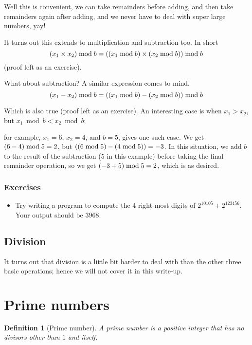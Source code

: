 \documentclass{article}
\newtheorem{definition}{Definition}
\DeclarePairedDelimiter{\braces}{(}{)}
\begin{document}
Well this is convenient, we can take remainders before adding, and then take
remainders again after adding, and we never have to deal with super large numbers, yay!

\vspace{1em}

It turns out this extends to multiplication and subtraction too.
In short
\[\left(x_1 \times x_2\right) \bmod b =
\braces*{\braces*{x_1 \bmod b} \times \braces*{x_2 \bmod b}} \bmod b\]
(proof left as an exercise).

What about subtraction?
A similar expression comes to mind.
\[\left(x_1 - x_2\right) \bmod b =
\braces*{\braces*{x_1 \bmod b} - \braces*{x_2 \bmod b}} \bmod b\]

Which is also true (proof left as an exercise).
An interesting case is when $x_1 > x_2$, but $x_1 \bmod b < x_2 \bmod b$;

for example, $x_1 = 6$, $x_2 = 4$, and $b = 5$, gives one such case.
We get $\braces*{6 - 4} \bmod 5 = 2$, but
$\braces*{\braces*{6 \bmod 5} - \braces*{4 \bmod 5}} = -3$.
In this situation, we add $b$ to the result of the subtraction
($5$ in this example) before taking the final remainder operation, 
so we get $\braces*{-3 + 5} \bmod 5 = 2$, which is as desired.

\subsubsection{Exercises}
\begin{itemize}
	\item
		Try writing a program to compute the 4 right-most digits of
		$2^{10105} + 2^{123456}$. Your output should be $3968$.
\end{itemize}

\subsection{Division}

It turns out that division is a little bit harder to deal with than the other
three basic operations; hence we will not cover it in this write-up.

\newpage

\section{Prime numbers}

\begin{definition}[Prime number]
	A prime number is a positive integer that has no divisors other than $1$ and
	itself.
\end{definition}
\end{document}
